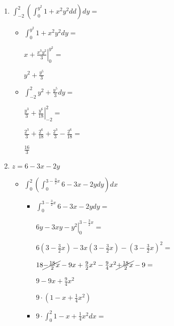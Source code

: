 \documentclass[../practica_08.tex]{subfiles}
\begin{document}
    \begin{enumerate}
        \item $\int_{-2}^{2} (\int_0^{y^2} 1+x^2y^2 dd ) dy = $
        
            \begin{itemize}
                \item $\int_0^{y^2} 1+x^2y^2 dy = $
                
                    $\left. x+\frac{x^3y^2}{3} \right |_0^{y^2} = $

                    $  y^2 + \frac{y^5}{3} $

                \item $\int_{-2}^2 y^2 + \frac{y^5}{3} dy = $
                
                    $ \left. \frac{y^3}{3} + \frac{y^6}{18} \right |_{-2}^2 = $

                    $ \frac{2^3}{3} + \frac{2^6}{18} + \frac{2^3}{3} - \frac{2^6}{18} = $

                    $ \frac{16}{3} $

            \end{itemize}

        \item $ z = 6 -3x -2y  $

            \begin{itemize}
                \item $\int_0^2 (\int_0^{3-\frac{3}{2}x} 6 -3x -2y dy) dx$
                
                    \begin{itemize}
                        \item $\int_0^{3-\frac{3}{2}x} 6 -3x -2y dy = $
                        
                            $ \left. 6y-3xy-y^2 \right |_0^{3-\frac{3}{2}x} = $

                            $ 6(3-\frac{3}{2}x)-3x(3-\frac{3}{2}x)-(3-\frac{3}{2}x)^2 = $

                            $ 18 \cancel{- \frac{18}{2}x} - 9x + \frac{9}{2}x^2 - \frac{9}{4}x^2 \cancel{+ \frac{18}{2}x} - 9 = $

                            $ 9 - 9x + \frac{9}{4}x^2 $

                            $ 9 \cdot(1 - x + \frac{1}{4}x^2) $

                        \item $9 \cdot \int_0^2 1 - x + \frac{1}{4}x^2 dx = $
                        

\end{itemize}
\end{itemize}
\end{enumerate}
\end{document}
